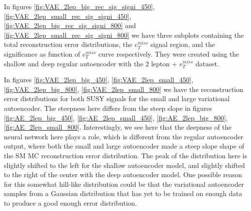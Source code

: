 In figures \ref{fig:VAE_2lep_big_rec_sig_signi_450}, \ref{fig:VAE_2lep_small_rec_sig_signi_450}, 
\ref{fig:VAE_2lep_big_rec_sig_signi_800} and \ref{fig:VAE_2lep_small_rec_sig_signi_800} we have three 
subplots containing the total reconstruction error distributions, the $e_T^{miss}$ signal region, 
and the significance as function of $e_T^{miss}$ curve respectively. They were created using 
the shallow and deep regular autoencoder with the 2 lepton + $e_T^{miss}$ dataset. \par
In figures \ref{fig:VAE_2lep_big_450}, \ref{fig:VAE_2lep_small_450}, \ref{fig:VAE_2lep_big_800}, 
\ref{fig:VAE_2lep_small_800} we have the reconstruction error distributions 
for both SUSY signals for the small and large variational autoencoder. 
The steepness here differs from the steep slope in figures 
\ref{fig:AE_2lep_big_450}, \ref{fig:AE_2lep_small_450}, \ref{fig:AE_2lep_big_800}, 
\ref{fig:AE_2lep_small_800}. Interestingly, we see here that the deepness of the neural 
network here plays a role, which is different from the regular autoencoder output, where both 
the small and large autoencoder made a steep slope shape of the SM MC reconstruction error 
distribution. The peak of the distribution here is slightly shifted to the left for the shallow 
autoencoder model, and slightly shifted to the right of the center with the deep autoencoder 
model. One possible reason for this somewhat hill-like distribution could be that the 
variational autoencoder samples from a Gaussian distribution that has yet to be trained on 
enough data to produce a good enough error distribution. 
\par 

